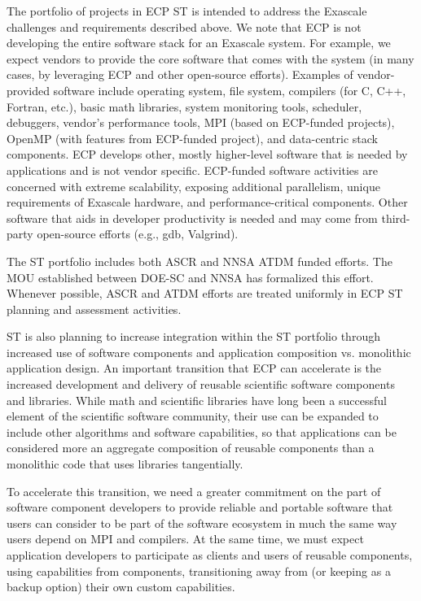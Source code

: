 The portfolio of projects in ECP ST is intended to address the Exascale challenges and requirements described above. We note that ECP is not developing the entire software stack for an Exascale system. For example, we expect vendors to provide the core software that comes with the system (in many cases, by leveraging ECP and other open-source efforts). Examples of vendor-provided software include operating system, file system, compilers (for C, C++, Fortran, etc.), basic math libraries, system monitoring tools, scheduler, debuggers, vendor’s performance tools, MPI (based on ECP-funded projects), OpenMP (with features from ECP-funded project), and data-centric stack components. ECP develops other, mostly higher-level software that is needed by applications and is not vendor specific. ECP-funded software activities are concerned with extreme scalability, exposing additional parallelism, unique requirements of Exascale hardware, and performance-critical components. Other software that aids in developer productivity is needed and may come from third-party open-source efforts (e.g., gdb, Valgrind).

The ST portfolio includes both ASCR and NNSA ATDM funded efforts. The MOU established between DOE-SC and NNSA has formalized this effort.  Whenever possible, ASCR and ATDM efforts are treated uniformly in ECP ST planning and assessment activities.

ST is also planning to increase integration within the ST portfolio through increased use of software components and application composition vs. monolithic application design. An important transition that ECP can accelerate is the increased development and delivery of reusable scientific software components and libraries. While math and scientific libraries have long been a successful element of the scientific software community, their use can be expanded to include other algorithms and software capabilities, so that applications can be considered more an aggregate composition of reusable components than a monolithic code that uses libraries tangentially.

To accelerate this transition, we need a greater commitment on the part of software component developers to provide reliable and portable software that users can consider to be part of the software ecosystem in much the same way users depend on MPI and compilers. At the same time, we must expect application developers to participate as clients and users of reusable components, using capabilities from components, transitioning away from (or keeping as a backup option) their own custom capabilities.

